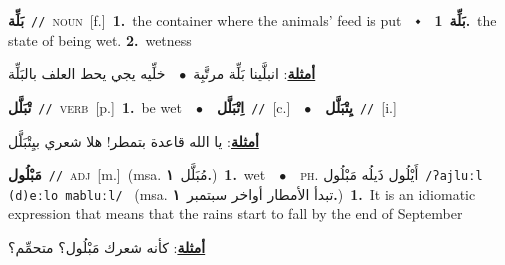 \documentclass[10pt,a4paper,twoside]{article} %
\begin{document}
\begin{multicols}{2}
{\setlength\topsep{0pt}\textbf{\foreignlanguage{arabic}{بَلِّة}}\ {\color{gray}\texttt{//}\color{black}}\ \textsc{noun}\ [f.]\ \textbf{1.}~the container where the animals' feed is put\ \ $\smblkdiamond$\ \ \setlength\topsep{0pt}\textbf{\foreignlanguage{arabic}{بَلِّة}}\ \textbf{1.}~the state of being wet.  \textbf{2.}~wetness\  \begin{flushright}\color{gray}\foreignlanguage{arabic}{\textbf{\underline{\foreignlanguage{arabic}{أمثلة}}}: انبلَّينا بَلِّة مرتَّبِة\ $\bullet$\ \  خلِّيه يجي يحط العلف بالبَلِّة}\end{flushright}\color{black}} \vspace{2mm}

{\setlength\topsep{0pt}\textbf{\foreignlanguage{arabic}{تْبَلَّل}}\ {\color{gray}\texttt{//}\color{black}}\ \textsc{verb}\ [p.]\ \textbf{1.}~be wet\ \ $\bullet$\ \ \setlength\topsep{0pt}\textbf{\foreignlanguage{arabic}{اِتْبَلَّل}}\ {\color{gray}\texttt{//}\color{black}}\ [c.]\ \ $\bullet$\ \ \setlength\topsep{0pt}\textbf{\foreignlanguage{arabic}{يِتْبَلَّل}}\ {\color{gray}\texttt{//}\color{black}}\ [i.]\  \begin{flushright}\color{gray}\foreignlanguage{arabic}{\textbf{\underline{\foreignlanguage{arabic}{أمثلة}}}: يا الله قاعدة بتمطر! هلا شعري بيِتْبَلَّل}\end{flushright}\color{black}} \vspace{2mm}

{\setlength\topsep{0pt}\textbf{\foreignlanguage{arabic}{مَبْلُول}}\ {\color{gray}\texttt{//}\color{black}}\ \textsc{adj}\ [m.]\ \color{gray}(msa. \foreignlanguage{arabic}{مُبَلَّل}~\foreignlanguage{arabic}{\textbf{١.}})\color{black}\ \textbf{1.}~wet\ \ $\bullet$\ \ \textsc{ph.} \color{gray} \foreignlanguage{arabic}{أَيْلُول ذَيلُه مَبْلُول}\color{black}\ {\color{gray}\texttt{/{\sffamily ʔajluːl (d)eːlo mabluːl}/}\color{black}}\ \color{gray} (msa. \foreignlanguage{arabic}{تبدأ الأمطار أواخر سبتمبر}~\foreignlanguage{arabic}{\textbf{١.}})\color{black}\ \textbf{1.}~It is an idiomatic expression that means  that the rains start to fall by the end of September\  \begin{flushright}\color{gray}\foreignlanguage{arabic}{\textbf{\underline{\foreignlanguage{arabic}{أمثلة}}}: كأنه شعرك مَبْلُول؟ متحمِّم؟}\end{flushright}\color{black}} \vspace{2mm}


\end{multicols}
\end{document}
